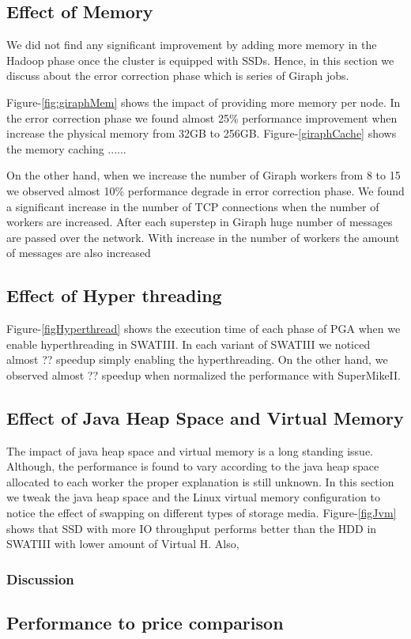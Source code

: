 \subsection {Effect of Memory}
We did not find any significant improvement by adding more memory in the Hadoop phase once the cluster is equipped with SSDs. Hence, in this section we discuss about the error correction phase which is series of Giraph jobs.

Figure-\ref{fig:giraphMem} shows the impact of providing more memory per node.
In the error correction phase we found almost 25\% performance improvement when increase the physical memory from 32GB to 256GB.
Figure-\ref{giraphCache} shows the memory caching ......

On the other hand, when we increase the number of Giraph workers from 8 to 15 we observed almost 10\% performance degrade in error correction phase.
We found a significant increase in the number of TCP connections when the number of workers are increased.
After each superstep in Giraph huge number of messages are passed over the network.
With increase in the number of workers the amount of messages are also increased

\subsection {Effect of Hyper threading}
Figure-\ref{figHyperthread} shows the execution time of each phase of PGA when we enable hyperthreading in SWATIII.
In each variant of SWATIII we noticed almost ?? speedup simply enabling the hyperthreading.
On the other hand, we observed almost ?? speedup when normalized the performance with SuperMikeII.

\subsection {Effect of Java Heap Space and Virtual Memory}
The impact of java heap space and virtual memory is a long standing issue.
Although, the performance is found to vary according to the java heap space allocated to each worker the proper explanation is still unknown.
In this section we tweak the java heap space and the Linux virtual memory configuration to notice the effect of swapping on different types of storage media.
Figure-\ref{figJvm} shows that SSD with more IO throughput performs better than the HDD in SWATIII with lower amount of Virtual H.
Also, 

\subsubsection {Discussion}




\subsection {Performance to price comparison}